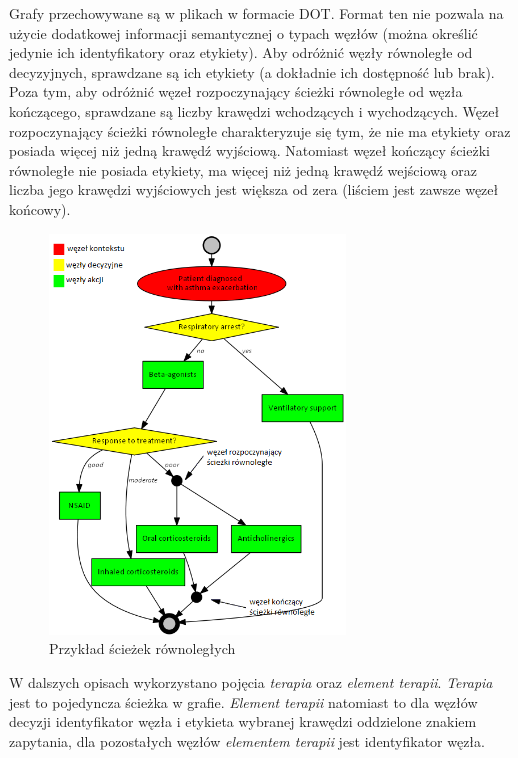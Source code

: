 Grafy przechowywane są w plikach w formacie DOT. Format ten nie pozwala na użycie dodatkowej informacji semantycznej o typach węzłów (można określić jedynie ich identyfikatory oraz etykiety). Aby odróżnić węzły równoległe od decyzyjnych, sprawdzane są ich etykiety (a dokładnie ich dostępność lub brak). Poza tym, aby odróżnić węzeł rozpoczynający ścieżki równoległe od węzła kończącego, sprawdzane są liczby krawędzi wchodzących i wychodzących. Węzeł rozpoczynający ścieżki równoległe charakteryzuje się tym, że nie ma etykiety oraz posiada więcej niż jedną krawędź wyjściową. Natomiast węzeł kończący ścieżki równoległe nie posiada etykiety, ma więcej niż jedną krawędź wejściową oraz liczba jego krawędzi wyjściowych jest większa od zera (liściem jest zawsze węzeł końcowy).

\begin{figure}[H]
\centering
\includegraphics[width=0.7\textwidth]{img/asthma_sciezki_rownolegle.png}
\caption{Przykład ścieżek równoległych}
\label{fig:sciezki_rownolegle}
\end{figure}

W dalszych opisach wykorzystano pojęcia \textit{terapia} oraz \textit{element terapii}. \textit{Terapia} jest to pojedyncza ścieżka w grafie. \textit{Element terapii} natomiast to dla węzłów decyzji identyfikator węzła i etykieta wybranej krawędzi oddzielone znakiem zapytania, dla pozostałych węzłów \textit{elementem terapii} jest identyfikator węzła.

